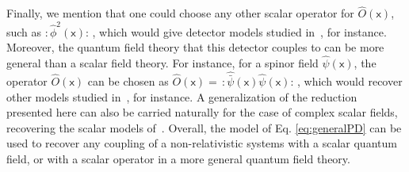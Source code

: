 \documentclass[letterpaper,12pt,titlepage,oneside,final]{book}
\newcommand{\mf}{\mathsf}%
\begin{document}
Finally, we mention that one could choose any other scalar operator for $\hat{O}(\mf x)$, such as $:\!\!\hat{\phi}^2(\mf x)\!\!:\,$, which would give detector models studied in~\cite{eduAchimBosonFermion,Sachs1,sachs2018entanglement}, for instance. Moreover, the quantum field theory that this detector couples to can be more general than a scalar field theory. For instance, for a spinor field $\hat{\psi}(\mf x)$, the operator $\hat{O}(\mf x)$ can be chosen as $\hat{O}(\mf x) \!= \,:\!\!\hat{\bar{\psi}}(\mf x) \hat{\psi}(\mf x)\!\!:\,$, which would recover other models studied in~\cite{eduAchimBosonFermion,Sachs1,sachs2018entanglement}, for instance. A generalization of the reduction presented here can also be carried naturally for the case of complex scalar fields, recovering the scalar models of~\cite{neutrinos,antiparticles,carol}. Overall, the model of Eq. \eqref{eq:generalPD} can be used to recover any coupling of a non-relativistic systems with a scalar quantum field, or with a scalar operator in a more general quantum field theory.




\end{document}
